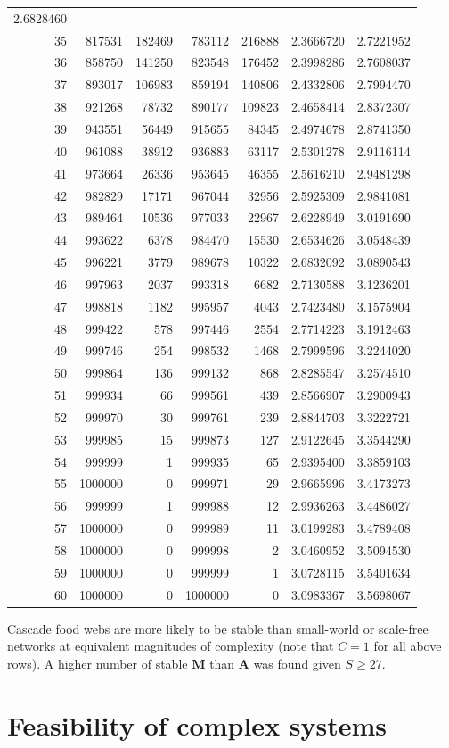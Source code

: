\documentclass[]{article}
\begin{document}
\begin{longtable}[]{@{}rrrrrrr@{}}
2.6828460\tabularnewline
35 & 817531 & 182469 & 783112 & 216888 & 2.3666720 &
2.7221952\tabularnewline
36 & 858750 & 141250 & 823548 & 176452 & 2.3998286 &
2.7608037\tabularnewline
37 & 893017 & 106983 & 859194 & 140806 & 2.4332806 &
2.7994470\tabularnewline
38 & 921268 & 78732 & 890177 & 109823 & 2.4658414 &
2.8372307\tabularnewline
39 & 943551 & 56449 & 915655 & 84345 & 2.4974678 &
2.8741350\tabularnewline
40 & 961088 & 38912 & 936883 & 63117 & 2.5301278 &
2.9116114\tabularnewline
41 & 973664 & 26336 & 953645 & 46355 & 2.5616210 &
2.9481298\tabularnewline
42 & 982829 & 17171 & 967044 & 32956 & 2.5925309 &
2.9841081\tabularnewline
43 & 989464 & 10536 & 977033 & 22967 & 2.6228949 &
3.0191690\tabularnewline
44 & 993622 & 6378 & 984470 & 15530 & 2.6534626 &
3.0548439\tabularnewline
45 & 996221 & 3779 & 989678 & 10322 & 2.6832092 &
3.0890543\tabularnewline
46 & 997963 & 2037 & 993318 & 6682 & 2.7130588 &
3.1236201\tabularnewline
47 & 998818 & 1182 & 995957 & 4043 & 2.7423480 &
3.1575904\tabularnewline
48 & 999422 & 578 & 997446 & 2554 & 2.7714223 & 3.1912463\tabularnewline
49 & 999746 & 254 & 998532 & 1468 & 2.7999596 & 3.2244020\tabularnewline
50 & 999864 & 136 & 999132 & 868 & 2.8285547 & 3.2574510\tabularnewline
51 & 999934 & 66 & 999561 & 439 & 2.8566907 & 3.2900943\tabularnewline
52 & 999970 & 30 & 999761 & 239 & 2.8844703 & 3.3222721\tabularnewline
53 & 999985 & 15 & 999873 & 127 & 2.9122645 & 3.3544290\tabularnewline
54 & 999999 & 1 & 999935 & 65 & 2.9395400 & 3.3859103\tabularnewline
55 & 1000000 & 0 & 999971 & 29 & 2.9665996 & 3.4173273\tabularnewline
56 & 999999 & 1 & 999988 & 12 & 2.9936263 & 3.4486027\tabularnewline
57 & 1000000 & 0 & 999989 & 11 & 3.0199283 & 3.4789408\tabularnewline
58 & 1000000 & 0 & 999998 & 2 & 3.0460952 & 3.5094530\tabularnewline
59 & 1000000 & 0 & 999999 & 1 & 3.0728115 & 3.5401634\tabularnewline
60 & 1000000 & 0 & 1000000 & 0 & 3.0983367 & 3.5698067\tabularnewline
\bottomrule
\end{longtable}

Cascade food webs are more likely to be stable than small-world or
scale-free networks at equivalent magnitudes of complexity (note that
\(C = 1\) for all above rows). A higher number of stable \(\mathbf{M}\)
than \(\mathbf{A}\) was found given \(S \geq 27\).

\hypertarget{Feasibility}{\section{Feasibility of complex
systems}\label{Feasibility}}
\end{document}
